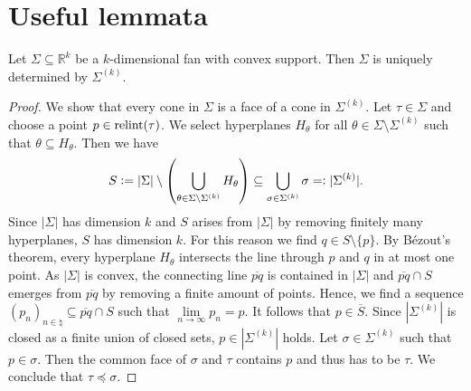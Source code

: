 \chapter{Useful lemmata}

\begin{lemmaApp}
	\label{lemma:convex_fan_maximal_cones}
	Let $\Sigma\subseteq\mathbb{R}^k$ be a $k$-dimensional fan with convex support. Then $\Sigma$ is uniquely determined by $\Sigma^{(k)}$.
\end{lemmaApp}
\begin{proof}
	We show that every cone in $\Sigma$ is a face of a cone in $\Sigma^{(k)}$. Let $\tau\in\Sigma$ and choose a point $p\in\text{relint}(\tau)$. We select hyperplanes $H_\theta$ for all $\theta\in\Sigma\setminus\Sigma^{(k)}$ such that $\theta\subseteq H_\theta$. Then we have
	$$S \mathrel{\mathop:}= |\Sigma| \setminus \left(\bigcup_{\theta\in\Sigma\setminus\Sigma^{(k)}} H_\theta\right) \subseteq \bigcup_{\sigma\in\Sigma^{(k)}} \sigma =\mathrel{\mathop:} |\Sigma^{(k)}|.$$
	Since $|\Sigma|$ has dimension $k$ and $S$ arises from $|\Sigma|$ by removing finitely many hyperplanes, $S$ has dimension $k$. For this reason we find $q\in S \setminus\{p\}$. By Bézout's theorem, every hyperplane $H_\theta$ intersects the line through $p$ and $q$ in at most one point. As $|\Sigma|$ is convex, the connecting line $\overline{pq}$ is contained in $|\Sigma|$ and $\overline{pq} \cap S$ emerges from $\overline{pq}$ by removing a finite amount of points. Hence, we find a sequence $(p_n)_{n\in\natural}\subseteq \overline{pq} \cap S$ such that $\lim\limits_{n\rightarrow\infty} p_n = p$. It follows that $p\in\overline{S}$. Since $|\Sigma^{(k)}|$ is closed as a finite union of closed sets, $p\in|\Sigma^{(k)}|$ holds. Let $\sigma\in\Sigma^{(k)}$ such that $p\in\sigma$. Then the common face of $\sigma$ and $\tau$ contains $p$ and thus has to be $\tau$. We conclude that $\tau\preceq\sigma$.
\end{proof}